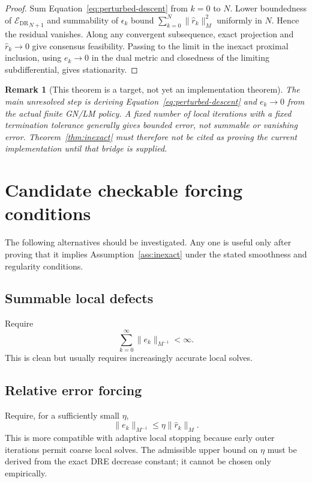 \documentclass[11pt]{article}
\newtheorem{remark}{Remark}
\newcommand{\Edr}{\mathcal{E}_{\mathrm{DR}}}
\newcommand{\normM}[1]{\lVert #1\rVert_M}
\newcommand{\normMi}[1]{\lVert #1\rVert_{M^{-1}}}
\begin{document}
\begin{proof}
Sum Equation~\eqref{eq:perturbed-descent} from $k=0$ to $N$.  Lower
boundedness of $\widehat{\Edr}_{N+1}$ and summability of $\epsilon_k$ bound
$\sum_{k=0}^N\normM{\widehat r_k}^2$ uniformly in $N$.  Hence the residual
vanishes.  Along any convergent subsequence, exact projection and
$\widehat r_k\to0$ give consensus feasibility.  Passing to the limit in the
inexact proximal inclusion, using $e_k\to0$ in the dual metric and closedness
of the limiting subdifferential, gives stationarity.
\end{proof}

\begin{remark}[This theorem is a target, not yet an implementation theorem]
The main unresolved step is deriving Equation~\eqref{eq:perturbed-descent}
and $e_k\to0$ from the actual finite GN/LM policy.  A fixed number of local
iterations with a fixed termination tolerance generally gives bounded error,
not summable or vanishing error.  Theorem~\ref{thm:inexact} must therefore not
be cited as proving the current implementation until that bridge is supplied.
\end{remark}

\section{Candidate checkable forcing conditions}

The following alternatives should be investigated.  Any one is useful only
after proving that it implies Assumption~\ref{ass:inexact} under the stated
smoothness and regularity conditions.

\subsection{Summable local defects}

Require
\begin{equation}
  \sum_{k=0}^{\infty}\normMi{e_k}<\infty.
  \label{eq:summable-defect}
\end{equation}
This is clean but usually requires increasingly accurate local solves.

\subsection{Relative error forcing}

Require, for a sufficiently small $\eta$,
\begin{equation}
  \normMi{e_k}\leq\eta\normM{\widehat r_k}.
  \label{eq:relative-error}
\end{equation}
This is more compatible with adaptive local stopping because early outer
iterations permit coarse local solves.  The admissible upper bound on $\eta$
must be derived from the exact DRE decrease constant; it cannot be chosen only
empirically.
\end{document}
